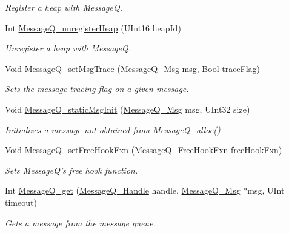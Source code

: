 \begin{DoxyCompactItemize}
\begin{DoxyCompactList}\small\item\em Register a heap with Message\-Q. \end{DoxyCompactList}\item 
Int \hyperlink{_message_q_8h_a4258fb35928047e54b625009c86ec4ba}{Message\-Q\-\_\-unregister\-Heap} (U\-Int16 heap\-Id)
\begin{DoxyCompactList}\small\item\em Unregister a heap with Message\-Q. \end{DoxyCompactList}\item 
Void \hyperlink{_message_q_8h_a74dc311c0b89f6fcbb309a5a98ab349f}{Message\-Q\-\_\-set\-Msg\-Trace} (\hyperlink{_message_q_8h_ab675d3cdd0443a1ad05658d375458204}{Message\-Q\-\_\-\-Msg} msg, Bool trace\-Flag)
\begin{DoxyCompactList}\small\item\em Sets the message tracing flag on a given message. \end{DoxyCompactList}\item 
Void \hyperlink{_message_q_8h_a5b627fa66c267f53cccb0a960fe23a64}{Message\-Q\-\_\-static\-Msg\-Init} (\hyperlink{_message_q_8h_ab675d3cdd0443a1ad05658d375458204}{Message\-Q\-\_\-\-Msg} msg, U\-Int32 size)
\begin{DoxyCompactList}\small\item\em Initializes a message not obtained from \hyperlink{_message_q_8h_ad8de6381a05a4d8a672d06a3b5676a24}{Message\-Q\-\_\-alloc()} \end{DoxyCompactList}\item 
Void \hyperlink{_message_q_8h_af487f79f7661b7622835e9c37045a23f}{Message\-Q\-\_\-set\-Free\-Hook\-Fxn} (\hyperlink{_message_q_8h_a23830422bfdc9ec8ca7df2d5a20c92ee}{Message\-Q\-\_\-\-Free\-Hook\-Fxn} free\-Hook\-Fxn)
\begin{DoxyCompactList}\small\item\em Sets Message\-Q's free hook function. \end{DoxyCompactList}\item 
Int \hyperlink{_message_q_8h_aaeb270f6b50d96f1e1dd134591ffc380}{Message\-Q\-\_\-get} (\hyperlink{_message_q_8h_a1d584ce08733ca864d81e1e64a41cf7a}{Message\-Q\-\_\-\-Handle} handle, \hyperlink{_message_q_8h_ab675d3cdd0443a1ad05658d375458204}{Message\-Q\-\_\-\-Msg} $\ast$msg, U\-Int timeout)
\begin{DoxyCompactList}\small\item\em Gets a message from the message queue. \end{DoxyCompactList}\item 

\end{DoxyCompactItemize}
